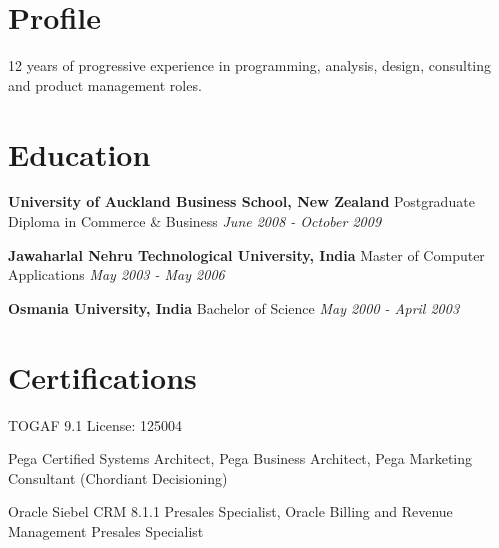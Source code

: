 \documentclass[line, margin]{res}
\begin{document}
	\thispagestyle{empty} %
	\address {\href {gvsriramakrishna@gmail.com} {gvsriramakrishna@gmail.com} \hspace{5ex}  Ph:+91.9642102244 	\hspace{5ex} \href{https://www.linkedin.com/in/ramakrishnagonella/}{LinkedIn}}
	

\begin{resume}

		\section{Profile}
		12 years of progressive experience in programming, analysis, design, consulting and product management roles.

		\section{Education}
			 {\bf University of Auckland Business School, New Zealand}
			 \newline Postgraduate Diploma in Commerce \& Business \textit { \hspace{3ex} June 2008 \-- October 2009}
			 
			{\bf Jawaharlal Nehru Technological University, India}
			 \newline Master of Computer Applications \textit{ \hspace{3ex} May 2003 \-- May 2006}
			
			{\bf Osmania University, India}
			\newline Bachelor of Science \textit{ \hspace{3ex} May 2000 \-- April 2003 }

		\section{Certifications}
					TOGAF 9.1 License: 125004 
					
					Pega Certified Systems Architect, Pega Business Architect, Pega Marketing Consultant (Chordiant Decisioning)
					
					Oracle Siebel CRM 8.1.1 Presales Specialist, Oracle Billing and Revenue Management Presales Specialist
		

\end{resume}
\end{document}
